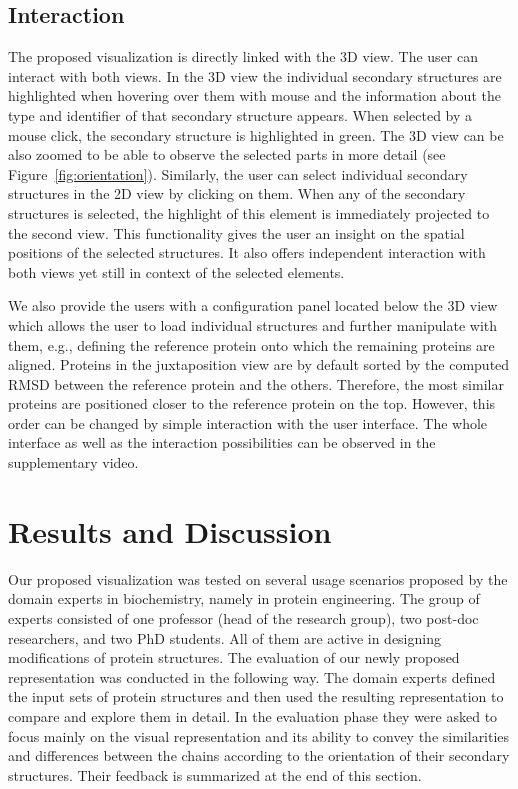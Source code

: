 \documentclass[twocolumn]{bmcart}%
\begin{document}
\subsection*{Interaction}
The proposed visualization is directly linked with the 3D view.
The user can interact with both views.
In the 3D view the individual secondary structures are highlighted when hovering over them with mouse and the information about the type and identifier of that secondary structure appears.
When selected by a mouse click, the secondary structure is highlighted in green.
The 3D view can be also zoomed to be able to observe the selected parts in more detail (see Figure~\ref{fig:orientation}).
Similarly, the user can select individual secondary structures in the 2D view by clicking on them.
When any of the secondary structures is selected, the highlight of this element is immediately projected to the second view.
This functionality gives the user an insight on the spatial positions of the selected structures.
It also offers independent interaction with both views yet still in context of the selected elements.

We also provide the users with a configuration panel located below the 3D view which allows the user to load individual structures and further manipulate with them, e.g., defining the reference protein onto which the remaining proteins are aligned.
Proteins in the juxtaposition view are by default sorted by the computed RMSD between the reference protein and the others.
Therefore, the most similar proteins are positioned closer to the reference protein on the top.
However, this order can be changed by simple interaction with the user interface.   
The whole interface as well as the interaction possibilities can be observed in the supplementary video.

\section*{Results and Discussion}
Our proposed visualization was tested on several usage scenarios proposed by the domain experts in biochemistry, namely in protein engineering.
The group of experts consisted of one professor (head of the research group), two post-doc researchers, and two PhD students.
All of them are active in designing modifications of protein structures.
The evaluation of our newly proposed representation was conducted in the following way.
The domain experts defined the input sets of protein structures and then used the resulting representation to compare and explore them in detail. 
In the evaluation phase they were asked to focus mainly on the visual representation and its ability to convey the similarities and differences between the chains according to the orientation of their secondary structures.
Their feedback is summarized at the end of this section.
\end{document}
